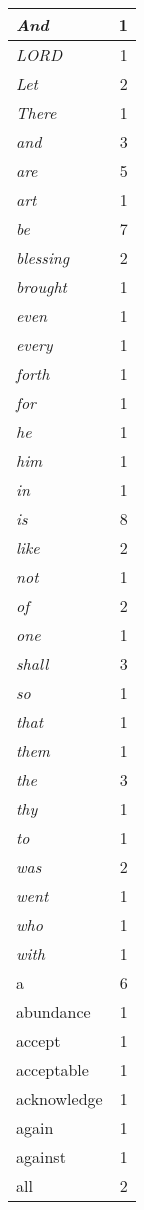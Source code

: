 \begin{center}
\begin{longtable}{l|r}
\emph{And} & 1 \\ \hline
\emph{LORD} & 1 \\ \hline
\emph{Let} & 2 \\ \hline
\emph{There} & 1 \\ \hline
\emph{and} & 3 \\ \hline
\emph{are} & 5 \\ \hline
\emph{art} & 1 \\ \hline
\emph{be} & 7 \\ \hline
\emph{blessing} & 2 \\ \hline
\emph{brought} & 1 \\ \hline
\emph{even} & 1 \\ \hline
\emph{every} & 1 \\ \hline
\emph{forth} & 1 \\ \hline
\emph{for} & 1 \\ \hline
\emph{he} & 1 \\ \hline
\emph{him} & 1 \\ \hline
\emph{in} & 1 \\ \hline
\emph{is} & 8 \\ \hline
\emph{like} & 2 \\ \hline
\emph{not} & 1 \\ \hline
\emph{of} & 2 \\ \hline
\emph{one} & 1 \\ \hline
\emph{shall} & 3 \\ \hline
\emph{so} & 1 \\ \hline
\emph{that} & 1 \\ \hline
\emph{them} & 1 \\ \hline
\emph{the} & 3 \\ \hline
\emph{thy} & 1 \\ \hline
\emph{to} & 1 \\ \hline
\emph{was} & 2 \\ \hline
\emph{went} & 1 \\ \hline
\emph{who} & 1 \\ \hline
\emph{with} & 1 \\ \hline
a & 6 \\ \hline
abundance & 1 \\ \hline
accept & 1 \\ \hline
acceptable & 1 \\ \hline
acknowledge & 1 \\ \hline
again & 1 \\ \hline
against & 1 \\ \hline
all & 2 \\ \hline

\end{longtable}
\end{center}
